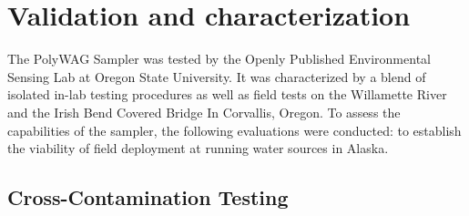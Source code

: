 \documentclass[11pt, letterpaper]{article}
\begin{document}


\section{Validation and characterization}


The PolyWAG Sampler was tested by the Openly Published Environmental Sensing Lab at Oregon State University. It was characterized by a blend of isolated in-lab testing procedures as well as field tests on the Willamette River and the Irish Bend Covered Bridge In Corvallis, Oregon. To assess the capabilities of the sampler, the following evaluations were conducted: to establish the viability of field deployment at running water sources in Alaska.

\subsection{Cross-Contamination Testing}
\end{document}
